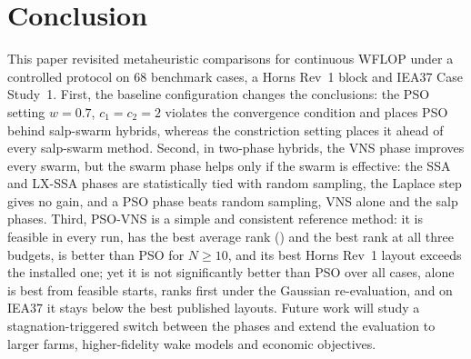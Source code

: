 \section{Conclusion}
\label{sec:conclusion}
This paper revisited metaheuristic comparisons for continuous WFLOP under a controlled protocol on 68 benchmark cases, a Horns Rev~1 block and IEA37 Case Study~1. First, the baseline configuration changes the conclusions: the PSO setting $w=0.7$, $c_1=c_2=2$ violates the convergence condition and places PSO behind salp-swarm hybrids, whereas the constriction setting places it ahead of every salp-swarm method. Second, in two-phase hybrids, the VNS phase improves every swarm, but the swarm phase helps only if the swarm is effective: the SSA and LX-SSA phases are statistically tied with random sampling, the Laplace step gives no gain, and a PSO phase beats random sampling, VNS alone and the salp phases. Third, PSO-VNS is a simple and consistent reference method: it is feasible in every run, has the best average rank (\NRankPSOVNS) and the best rank at all three budgets, is better than PSO for $N\ge10$, and its best Horns Rev~1 layout exceeds the installed one; yet it is not significantly better than PSO over all cases, \NFbFeasBestRank{} alone is best from feasible starts, \NBestGauss{} ranks first under the Gaussian re-evaluation, and on IEA37 it stays below the best published layouts.
Future work will study a stagnation-triggered switch between the phases and extend the evaluation to larger farms, higher-fidelity wake models and economic objectives.
